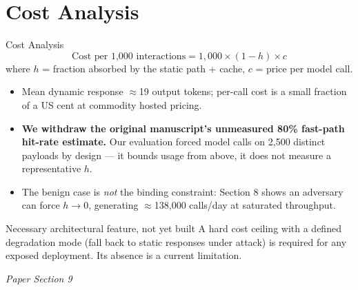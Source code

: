 \documentclass[aspectratio=169, 11pt]{beamer}
\newcommand{\srcnote}[1]{{\footnotesize\color{gray}\textit{#1}}}
\begin{document}
\section{Cost Analysis}
\begin{frame}{Cost Analysis}
    \[
    \text{Cost per 1{,}000 interactions} = 1{,}000 \times (1-h) \times c
    \]
    where $h$ = fraction absorbed by the static path + cache, $c$ = price per model call.
    \begin{itemize}
        \item Mean dynamic response $\approx$19 output tokens; per-call cost is a small fraction of a US cent at commodity hosted pricing.
        \item \textbf{We withdraw the original manuscript's unmeasured 80\% fast-path hit-rate estimate.} Our evaluation forced model calls on 2{,}500 distinct payloads by design --- it bounds usage from above, it does not measure a representative $h$.
        \item The benign case is \emph{not} the binding constraint: Section 8 shows an adversary can force $h \to 0$, generating $\approx$138{,}000 calls/day at saturated throughput.
    \end{itemize}
    \begin{block}{\small Necessary architectural feature, not yet built}
        \small A hard cost ceiling with a defined degradation mode (fall back to static responses under attack) is required for any exposed deployment. Its absence is a current limitation.
    \end{block}
    \srcnote{Paper Section 9}
\end{frame}

\end{document}
